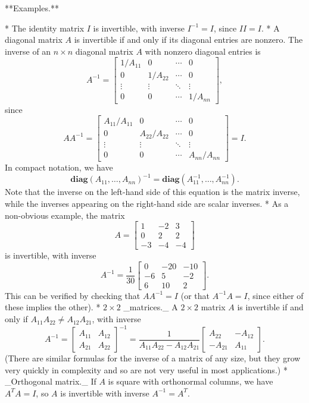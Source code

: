 

**Examples.**

* The identity matrix \(I\) is invertible, with inverse \(I^{-1}=I\), since \(II=I\).
* A diagonal matrix \(A\) is invertible if and only if its diagonal entries are nonzero. The inverse of an \(n\times n\) diagonal matrix \(A\) with nonzero diagonal entries is \[A^{-1}=\left[\begin{array}{cccc}1/A_{11}&0&\cdots&0\\ 0&1/A_{22}&\cdots&0\\ \vdots&\vdots&\ddots&\vdots\\ 0&0&\cdots&1/A_{nn}\end{array}\right],\] since \[AA^{-1}=\left[\begin{array}{cccc}A_{11}/A_{11}&0&\cdots&0\\ 0&A_{22}/A_{22}&\cdots&0\\ \vdots&\vdots&\ddots&\vdots\\ 0&0&\cdots&A_{nn}/A_{nn}\end{array}\right]=I.\] In compact notation, we have \[\mathbf{diag}(A_{11},\ldots,A_{nn})^{-1}=\mathbf{diag}(A_{11}^{-1},\ldots,A_{ nn}^{-1}).\] Note that the inverse on the left-hand side of this equation is the matrix inverse, while the inverses appearing on the right-hand side are scalar inverses.
* As a non-obvious example, the matrix \[A=\left[\begin{array}{cccc}1&-2&3\\ 0&2&2\\ -3&-4&-4\end{array}\right]\] is invertible, with inverse \[A^{-1}=\frac{1}{30}\left[\begin{array}{cccc}0&-20&-10\\ -6&5&-2\\ 6&10&2\end{array}\right].\] This can be verified by checking that \(AA^{-1}=I\) (or that \(A^{-1}A=I\), since either of these implies the other).
* \(2\times 2\) _matrices._ A \(2\times 2\) matrix \(A\) is invertible if and only if \(A_{11}A_{22}\neq A_{12}A_{21}\), with inverse \[A^{-1}=\left[\begin{array}{cccc}A_{11}&A_{12}\\ A_{21}&A_{22}\end{array}\right]^{-1}=\frac{1}{A_{11}A_{22}-A_{12}A_{21}}\left[ \begin{array}{cccc}A_{22}&-A_{12}\\ -A_{21}&A_{11}\end{array}\right].\] (There are similar formulas for the inverse of a matrix of any size, but they grow very quickly in complexity and so are not very useful in most applications.)
* _Orthogonal matrix._ If \(A\) is square with orthonormal columns, we have \(A^{T}A=I\), so \(A\) is invertible with inverse \(A^{-1}=A^{T}\).

